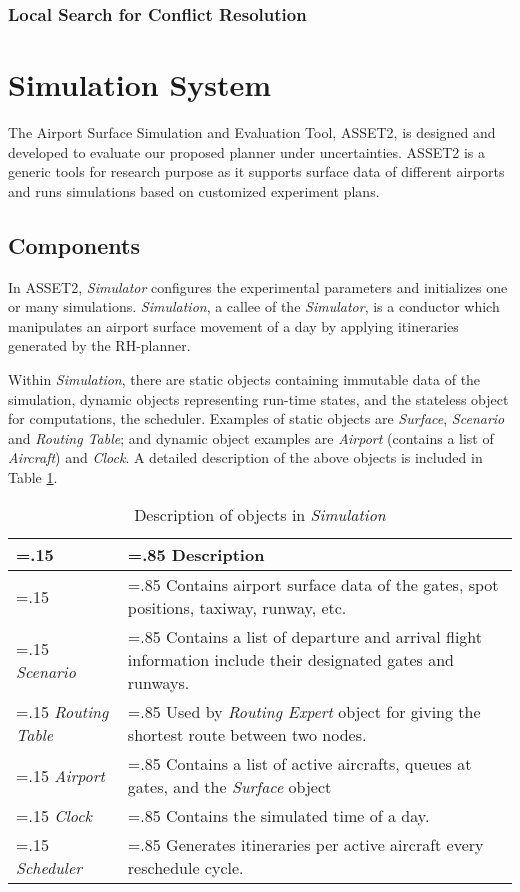 \documentclass[letterpaper, 10 pt, conference]{ieeeconf}
\begin{document}
\subsubsection{Local Search for Conflict Resolution}

\section{Simulation System}

The Airport Surface Simulation and Evaluation Tool, ASSET2, is designed and developed to evaluate our proposed planner under uncertainties. ASSET2 is a generic tools for research purpose as it supports surface data of different airports and runs simulations based on customized experiment plans.

\subsection{Components}

In ASSET2, {\it Simulator} configures the experimental parameters and initializes one or many simulations. {\it Simulation}, a callee of the {\it Simulator}, is a conductor which manipulates an airport surface movement of a day by applying itineraries generated by the RH-planner.

Within {\it Simulation}, there are static objects containing immutable data of the simulation, dynamic objects representing run-time states, and the stateless object for computations, the scheduler. Examples of static objects are {\it Surface}, {\it Scenario} and {\it Routing Table}; and dynamic object examples are {\it Airport} (contains a list of {\it Aircraft}) and {\it Clock}. A detailed description of the above objects is included in Table \ref{simulation-objects}.

\begin{table}[htbp]
\centering
\begin{tabularx}{\linewidth}{
    |>{\hsize=.15\hsize}X
    |>{\hsize=.85\hsize}X|}
\hline
 & {\bf Description} \\ \hline
{\it Surface} & Contains airport surface data of the gates, spot positions, taxiway, runway, etc. \\ \hline
{\it Scenario} & Contains a list of departure and arrival flight information include their designated gates and runways. \\ \hline
{\it Routing Table} & Used by {\it Routing Expert} object for giving the shortest route between two nodes. \\ \hline
{\it Airport} & Contains a list of active aircrafts, queues at gates, and the {\it Surface} object \\ \hline
{\it Clock} &  Contains the simulated time of a day. \\ \hline
{\it Scheduler}  & Generates itineraries per active aircraft every reschedule cycle. \\ \hline
\end{tabularx}
\label{simulation-objects}
\caption{Description of objects in {\it Simulation}}
\end{table}
\end{document}
